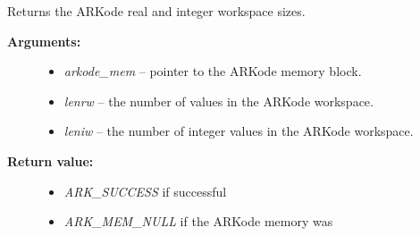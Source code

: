 \documentclass[letterpaper,10pt,english]{sphinxmanual}
\begin{document}
\begin{fulllineitems}
\label{c_interface/User_callable:c.ARKodeGetWorkSpace}
Returns the ARKode real and integer workspace sizes.
\begin{description}
\item[{\textbf{Arguments:}}] \leavevmode\begin{itemize}
\item {} 
\emph{arkode\_mem} -- pointer to the ARKode memory block.

\item {} 
\emph{lenrw} -- the number of  values in the ARKode workspace.

\item {} 
\emph{leniw} -- the number of integer values in the ARKode workspace.

\end{itemize}

\item[{\textbf{Return value:}}] \leavevmode\begin{itemize}
\item {} 
\emph{ARK\_SUCCESS} if successful

\item {} 
\emph{ARK\_MEM\_NULL} if the ARKode memory was 

\end{itemize}

\end{description}

\end{fulllineitems}

\end{document}
